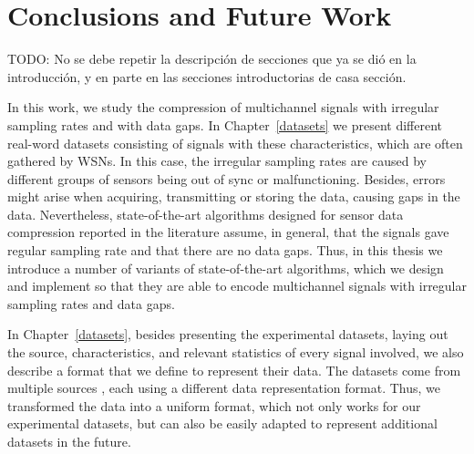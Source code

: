 
\chapter{Conclusions and Future Work} %
\label{conclusions} %



TODO: No se debe repetir la descripción de secciones que ya se dió en la introducción, y en parte en las secciones introductorias de casa sección.


In this work, we study the compression of multichannel signals with irregular sampling rates and with data gaps. In Chapter~\ref{datasets} we present different real-word datasets consisting of signals with these characteristics, which are often gathered by WSNs. In this case, the irregular sampling rates are caused by different groups of sensors being out of sync or malfunctioning. Besides, errors might arise when acquiring, transmitting or storing the data, causing gaps in the data. Nevertheless, state-of-the-art algorithms designed for sensor data compression reported in the literature \cite{AnEva2013, Signal2016} assume, in general, that the signals gave regular sampling rate and that there are no data gaps. Thus, in this thesis we introduce a number of variants of state-of-the-art algorithms, which we design and implement so that they are able to encode multichannel signals with irregular sampling rates and data gaps. 


In Chapter~\ref{datasets}, besides presenting the experimental datasets, laying out the source, characteristics, and relevant statistics of every signal involved, we also describe a format that we define to represent their data. The datasets come from multiple sources \dataCite, each using a different data representation format. Thus, we transformed the data into a uniform format, which not only works for our experimental datasets, but can also be easily adapted to represent additional datasets in the future.


